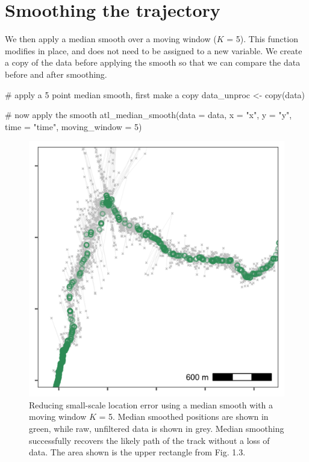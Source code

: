 \documentclass[]{scrreprt}
\newenvironment{Shaded}{}{}
\newcommand{\CommentTok}[1]{\textcolor[rgb]{0.00,0.50,0.00}{#1}}
\newcommand{\DataTypeTok}[1]{#1}
\newcommand{\DecValTok}[1]{#1}
\newcommand{\KeywordTok}[1]{\textcolor[rgb]{0.00,0.00,1.00}{#1}}
\newcommand{\NormalTok}[1]{#1}
\newcommand{\StringTok}[1]{\textcolor[rgb]{0.00,0.50,0.50}{#1}}
\begin{document}
\hypertarget{smoothing-the-trajectory}{%
\section{Smoothing the trajectory}\label{smoothing-the-trajectory}}

We then apply a median smooth over a moving window (\(K\) = 5).
This function modifies in place, and does not need to be assigned to a new variable.
We create a copy of the data before applying the smooth so that we can compare the data before and after smoothing.

\begin{Shaded}
\begin{Highlighting}[]
\CommentTok{# apply a 5 point median smooth, first make a copy}
\NormalTok{data_unproc <-}\StringTok{ }\KeywordTok{copy}\NormalTok{(data)}

\CommentTok{# now apply the smooth}
\KeywordTok{atl_median_smooth}\NormalTok{(}\DataTypeTok{data =}\NormalTok{ data,}
                  \DataTypeTok{x =} \StringTok{"x"}\NormalTok{, }\DataTypeTok{y =} \StringTok{"y"}\NormalTok{, }\DataTypeTok{time =} \StringTok{"time"}\NormalTok{,}
                  \DataTypeTok{moving_window =} \DecValTok{5}\NormalTok{)}
\end{Highlighting}
\end{Shaded}

\begin{figure}
\centering
\includegraphics{figures/fig_calib_median_smooth.png}
\caption{Reducing small-scale location error using a median smooth with a moving window \(K\) = 5. Median smoothed positions are shown in green, while raw, unfiltered data is shown in grey. Median smoothing successfully recovers the likely path of the track without a loss of data. The area shown is the upper rectangle from Fig. 1.3.}
\end{figure}
\end{document}
